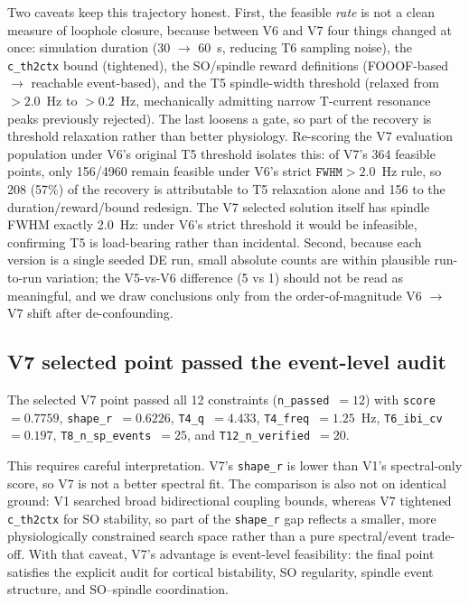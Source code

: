 \documentclass[conference]{IEEEtran}
\newcommand{\code}[1]{\texttt{#1}}
\begin{document}
Two caveats keep this trajectory honest. First, the feasible \emph{rate} is not
a clean measure of loophole closure, because between V6 and V7 four things
changed at once: simulation duration (30 $\to$ 60~s, reducing T6 sampling
noise), the \code{c\_th2ctx} bound (tightened), the SO/spindle reward
definitions (FOOOF-based $\to$ reachable event-based), and the T5 spindle-width
threshold (relaxed from $>2.0$~Hz to $>0.2$~Hz, mechanically admitting narrow
T-current resonance peaks previously rejected). The last loosens a gate, so part
of the recovery is threshold relaxation rather than better physiology.
Re-scoring the V7 evaluation population under V6's original T5 threshold
isolates this: of V7's 364 feasible points, only 156/4960 remain feasible under
V6's strict $\code{FWHM}>2.0$~Hz rule, so 208 (57\%) of the recovery is
attributable to T5 relaxation alone and 156 to the duration/reward/bound
redesign. The V7 selected solution itself has spindle FWHM exactly 2.0~Hz: under
V6's strict threshold it would be infeasible, confirming T5 is load-bearing
rather than incidental. Second, because each version is a single seeded DE run,
small absolute counts are within plausible run-to-run variation; the V5-vs-V6
difference (5 vs 1) should not be read as meaningful, and we draw conclusions
only from the order-of-magnitude V6 $\to$ V7 shift after de-confounding.

\subsection{V7 selected point passed the event-level audit}
The selected V7 point passed all 12 constraints
(\code{n\_passed}~$=12$) with \code{score}~$=0.7759$, \code{shape\_r}~$=0.6226$,
\code{T4\_q}~$=4.433$, \code{T4\_freq}~$=1.25$~Hz, \code{T6\_ibi\_cv}~$=0.197$,
\code{T8\_n\_sp\_events}~$=25$, and \code{T12\_n\_verified}~$=20$.

This requires careful interpretation. V7's \code{shape\_r} is lower than V1's
spectral-only score, so V7 is not a better spectral fit. The comparison is also
not on identical ground: V1 searched broad bidirectional coupling bounds,
whereas V7 tightened \code{c\_th2ctx} for SO stability, so part of the
\code{shape\_r} gap reflects a smaller, more physiologically constrained search
space rather than a pure spectral/event trade-off. With that caveat, V7's
advantage is event-level feasibility: the final point satisfies the explicit
audit for cortical bistability, SO regularity, spindle event structure, and
SO--spindle coordination.
\end{document}

